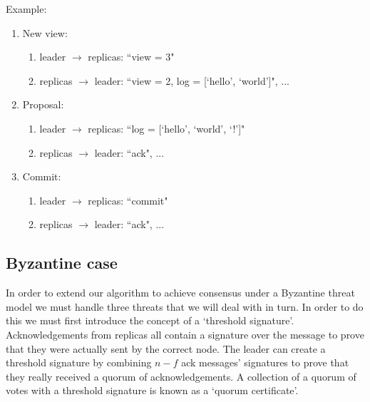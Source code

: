\documentclass[a4paper]{article}
\begin{document}
Example:

\begin{enumerate}
\item New view: 
	\begin{enumerate}
	\item leader $\to$ replicas: ``view = 3" 
	\item replicas $\to$ leader: ``view = 2, log = [`hello', `world']", ...
	\end{enumerate}
\item Proposal:
	\begin{enumerate}
	\item leader $\to$ replicas: ``log = [`hello', `world', `!']"
	\item replicas $\to$ leader: ``ack", ...
	\end{enumerate}
\item Commit:
	\begin{enumerate}
	\item leader $\to$ replicas: ``commit"
	\item replicas $\to$ leader: ``ack", ...
	\end{enumerate}
\end{enumerate}

\subsection{Byzantine case}
In order to extend our algorithm to achieve consensus under a Byzantine threat model we must handle three threats that we will deal with in turn. In order to do this we must first introduce the concept of a `threshold signature'. Acknowledgements from replicas all contain a signature over the message to prove that they were actually sent by the correct node. The leader can create a threshold signature by combining $n - f $ ack messages' signatures to prove that they really received a quorum of acknowledgements. A collection of a quorum of votes with a threshold signature is known as a `quorum certificate'.
\end{document}
